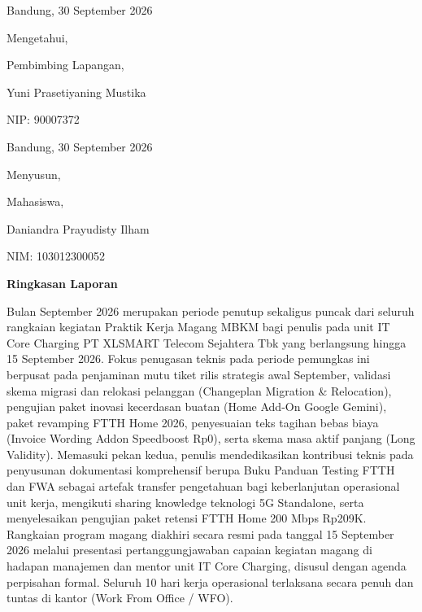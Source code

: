 \documentclass[12pt,a4paper]{article}
\begin{document}
\vspace{5.0cm}
\noindent
\begin{minipage}[t]{0.45\textwidth}
    \centering
    Bandung, 30 September 2026\par
    Mengetahui,\par
    Pembimbing Lapangan,\par
    \vspace{3.0cm}
    Yuni Prasetiyaning Mustika\par
    NIP: 90007372
\end{minipage}
\hfill
\begin{minipage}[t]{0.45\textwidth}
    \centering
    Bandung, 30 September 2026\par
    Menyusun,\par
    Mahasiswa,\par
    \vspace{3.0cm}
    Daniandra Prayudisty Ilham\par
    NIM: 103012300052
\end{minipage}

\clearpage
\setcounter{page}{2}

\begin{center}
    {\bfseries\large Ringkasan Laporan\par}
\end{center}
\vspace{0.8cm}

Bulan September 2026 merupakan periode penutup sekaligus puncak dari seluruh rangkaian kegiatan Praktik Kerja Magang MBKM bagi penulis pada unit IT Core Charging PT XLSMART Telecom Sejahtera Tbk yang berlangsung hingga 15 September 2026. Fokus penugasan teknis pada periode pemungkas ini berpusat pada penjaminan mutu tiket rilis strategis awal September, validasi skema migrasi dan relokasi pelanggan (Changeplan Migration \& Relocation), pengujian paket inovasi kecerdasan buatan (Home Add-On Google Gemini), paket revamping FTTH Home 2026, penyesuaian teks tagihan bebas biaya (Invoice Wording Addon Speedboost Rp0), serta skema masa aktif panjang (Long Validity). Memasuki pekan kedua, penulis mendedikasikan kontribusi teknis pada penyusunan dokumentasi komprehensif berupa Buku Panduan Testing FTTH dan FWA sebagai artefak transfer pengetahuan bagi keberlanjutan operasional unit kerja, mengikuti sharing knowledge teknologi 5G Standalone, serta menyelesaikan pengujian paket retensi FTTH Home 200 Mbps Rp209K. Rangkaian program magang diakhiri secara resmi pada tanggal 15 September 2026 melalui presentasi pertanggungjawaban capaian kegiatan magang di hadapan manajemen dan mentor unit IT Core Charging, disusul dengan agenda perpisahan formal. Seluruh 10 hari kerja operasional terlaksana secara penuh dan tuntas di kantor (Work From Office / WFO).
\end{document}
